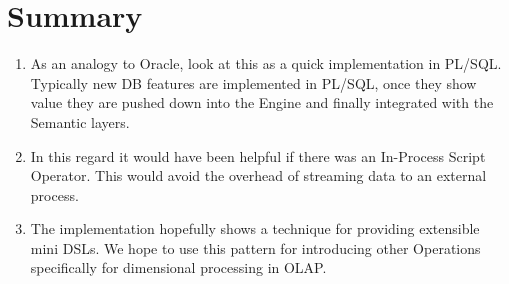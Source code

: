 \documentclass[pdftex,10pt,a4paper]{article}
\begin{document}
\section{Summary}
\begin{enumerate}
\item As an analogy to Oracle, look at this as a quick implementation in PL/SQL. Typically new DB features are implemented in PL/SQL, once they show value they are pushed down into the Engine and finally integrated with the Semantic layers.
\item In this regard it would have been helpful if there was an In-Process Script Operator. This would avoid the overhead of streaming data to an external process.
\item The implementation hopefully shows a technique for providing extensible mini DSLs. We hope to use this pattern for introducing other Operations specifically for dimensional processing in OLAP.
\end{enumerate}
\end{document}
